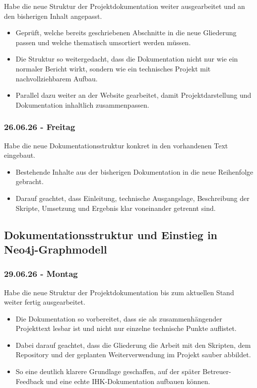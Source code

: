 Habe die neue Struktur der Projektdokumentation weiter ausgearbeitet und an den bisherigen Inhalt angepasst.

\begin{itemize}
    \item Geprüft, welche bereits geschriebenen Abschnitte in die neue Gliederung passen und welche thematisch umsortiert werden müssen.
    \item Die Struktur so weitergedacht, dass die Dokumentation nicht nur wie ein normaler Bericht wirkt, sondern wie ein technisches Projekt mit nachvollziehbarem Aufbau.
    \item Parallel dazu weiter an der Website gearbeitet, damit Projektdarstellung und Dokumentation inhaltlich zusammenpassen.
\end{itemize}

\subsubsection{26.06.26 - Freitag}

Habe die neue Dokumentationsstruktur konkret in den vorhandenen Text eingebaut.

\begin{itemize}
    \item Bestehende Inhalte aus der bisherigen Dokumentation in die neue Reihenfolge gebracht.
    \item Darauf geachtet, dass Einleitung, technische Ausgangslage, Beschreibung der Skripte, Umsetzung und Ergebnis klar voneinander getrennt sind.
\end{itemize}

\subsection{Dokumentationsstruktur und Einstieg in Neo4j-Graphmodell}
\subsubsection{29.06.26 - Montag}

Habe die neue Struktur der Projektdokumentation bis zum aktuellen Stand weiter fertig ausgearbeitet.

\begin{itemize}
  \item Die Dokumentation so vorbereitet, dass sie als zusammenhängender Projekttext lesbar ist und nicht nur einzelne technische Punkte auflistet.
  \item Dabei darauf geachtet, dass die Gliederung die Arbeit mit den Skripten, dem Repository und der geplanten Weiterverwendung im Projekt sauber abbildet.
  \item So eine deutlich klarere Grundlage geschaffen, auf der später Betreuer-Feedback und eine echte IHK-Dokumentation aufbauen können.
\end{itemize}

